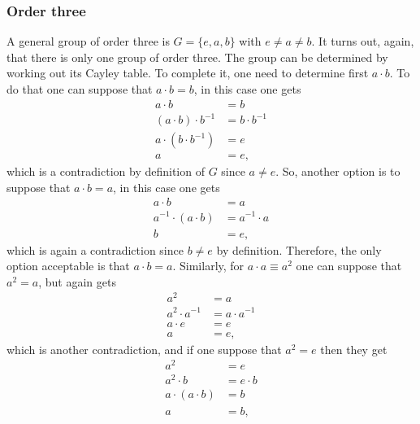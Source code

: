 \subsubsection{Order three}
A general group of order three is $G = \{e,a,b\}$ with $e \neq a \neq b$. It turns out, again, that there is only one group of order three. The group can be determined by working out its Cayley table. To complete it, one need to determine first $a \cdot b$. To do that one can suppose that $a \cdot b = b$, in this case one gets 
\begin{equation}
    \begin{split}
        a \cdot b &= b \\
        (a\cdot b)\cdot b^{-1} &= b\cdot b^{-1} \\
        a \cdot (b \cdot b^{-1}) &= e \\
        a &= e,
    \end{split}
\end{equation}
which is a contradiction by definition of $G$ since $a \neq e$. So, another option is to suppose that $a \cdot b = a$, in this case one gets
\begin{equation}
    \begin{split}
        a \cdot b &= a \\
        a^{-1} \cdot (a \cdot b) &= a^{-1} \cdot a \\
        b &= e,
    \end{split}
\end{equation}
which is again a contradiction since $b \neq e$ by definition. Therefore, the only option acceptable is that $a \cdot b = a$. Similarly, for $a \cdot a \equiv a^2$ one can suppose that $a^2 = a$, but again gets
\begin{equation}
    \begin{split}
        a^2 &= a \\
        a^2 \cdot a^{-1} &= a \cdot a^{-1} \\
        a \cdot e &= e \\
        a &= e,
    \end{split} 
\end{equation}
which is another contradiction, and if one suppose that $a^2 = e$ then they get
\begin{equation}
    \begin{split}
        a^2 &= e \\
        a^2 \cdot b &= e \cdot b \\
        a \cdot (a\cdot b) &= b \\
        a &= b,
    \end{split}
\end{equation}
